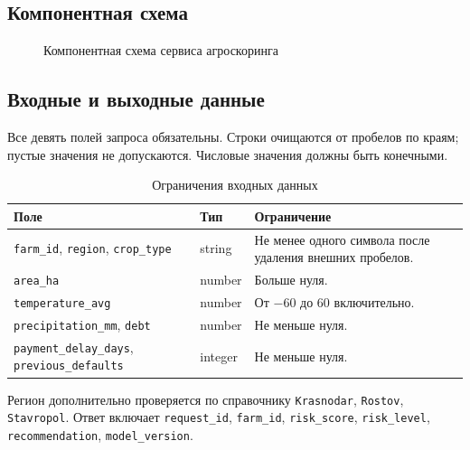 \documentclass[12pt,a4paper]{article}
\begin{document}
\subsection{Компонентная схема}
\begin{figure}[H]
\centering
{}
\caption{Компонентная схема сервиса агроскоринга}
\end{figure}

\subsection{Входные и выходные данные}
Все девять полей запроса обязательны. Строки очищаются от пробелов по краям; пустые значения не допускаются. Числовые значения должны быть конечными.
\begin{table}[H]
\centering\caption{Ограничения входных данных}
\begin{tabularx}{\textwidth}{|p{5cm}|p{2cm}|X|}\hline
Поле & Тип & Ограничение \\\hline
\texttt{farm\_id}, \texttt{region}, \texttt{crop\_type} & string & Не менее одного символа после удаления внешних пробелов. \\\hline
\texttt{area\_ha} & number & Больше нуля. \\\hline
\texttt{temperature\_avg} & number & От $-60$ до $60$ включительно. \\\hline
\texttt{precipitation\_mm}, \texttt{debt} & number & Не меньше нуля. \\\hline
\texttt{payment\_delay\_days}, \texttt{previous\_defaults} & integer & Не меньше нуля. \\\hline
\end{tabularx}
\end{table}
Регион дополнительно проверяется по справочнику \texttt{Krasnodar}, \texttt{Rostov}, \texttt{Stavropol}. Ответ включает \texttt{request\_id}, \texttt{farm\_id}, \texttt{risk\_score}, \texttt{risk\_level}, \texttt{recommendation}, \texttt{model\_version}.
\end{document}
